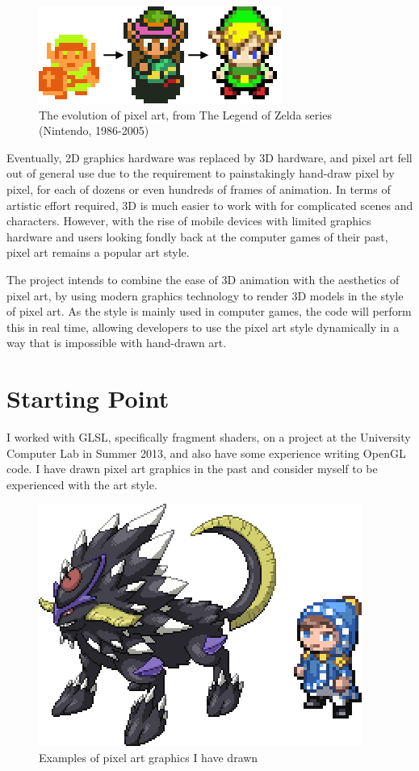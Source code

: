 \documentclass[12pt,twoside,notitlepage]{report}
\begin{document}
\begin{figure}[h!]
\centering
\includegraphics{linksprite}
\caption{The evolution of pixel art, from The Legend of Zelda series (Nintendo, 1986-2005)}
\end{figure}

Eventually, 2D graphics hardware was replaced by 3D hardware, and pixel art fell out of general use due to the requirement to painstakingly hand-draw pixel by pixel, for each of dozens or even hundreds of frames of animation. In terms of artistic effort required, 3D is much easier to work with for complicated scenes and characters. However, with the rise of mobile devices with limited graphics hardware and users looking fondly back at the computer games of their past, pixel art remains a popular art style.

The project intends to combine the ease of 3D animation with the aesthetics of pixel art, by using modern graphics technology to render 3D models in the style of pixel art. As the style is mainly used in computer games, the code will perform this in real time, allowing developers to use the pixel art style dynamically in a way that is impossible with hand-drawn art.

\section*{Starting Point}

I worked with GLSL, specifically fragment shaders, on a project at the University Computer Lab in Summer 2013, and also have some experience writing OpenGL code. I have drawn pixel art graphics in the past and consider myself to be experienced with the art style.

\begin{figure}[h!]
\centering
\includegraphics{examplesprite}
\caption{Examples of pixel art graphics I have drawn}
\end{figure}
\end{document}
